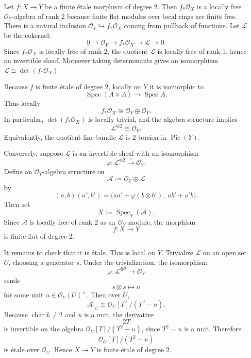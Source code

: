 \documentclass[12pt]{article}
\begin{document}
\begin{solution}
    Let \(f:X\to Y\) be a finite étale morphism of degree \(2\). Then \(f_*\mathcal O_X\) is a locally free \(\mathcal O_Y\)-algebra of rank \(2\) because finite flat modules over local rings are finite free. There is a natural inclusion $\mathcal O_Y\hookrightarrow f_*\mathcal O_X$
    coming from pullback of functions. Let \(\mathcal L\) be the cokernel:
    \[
        0\to \mathcal O_Y\to f_*\mathcal O_X\to \mathcal L\to 0.
    \]
    Since \(f_*\mathcal O_X\) is locally free of rank \(2\), the quotient \(\mathcal L\) is locally free of rank \(1\), hence an invertible sheaf. Moreover taking determinants gives an isomorphism $\mathcal L\cong \det(f_*\mathcal O_X)$

    Because \(f\) is finite étale of degree \(2\), locally on \(Y\) it is isomorphic to
    \[
        \operatorname{Spec}(A\times A)\to \operatorname{Spec} A.
    \]
    Thus locally
    \[
        f_*\mathcal O_X\cong \mathcal O_Y\oplus \mathcal O_Y.
    \]
    In particular, \(\det(f_*\mathcal O_X)\) is locally trivial, and the algebra structure implies
    \[
        \mathcal L^{\otimes 2}\cong \mathcal O_Y.
    \]
    Equivalently, the quotient line bundle \(\mathcal L\) is \(2\)-torsion in \(\operatorname{Pic}(Y)\).

    Conversely, suppose \(\mathcal L\) is an invertible sheaf with an isomorphism
    \[
        \varphi:\mathcal L^{\otimes 2}\xrightarrow{\sim}\mathcal O_Y.
    \]
    Define an \(\mathcal O_Y\)-algebra structure on
    \[
        \mathcal A:=\mathcal O_Y\oplus \mathcal L
    \]
    by
    \[
        (a,b)(a',b')
        =
        \bigl(aa'+\varphi(b\otimes b'),\; ab'+a'b\bigr).
    \]
    Then set
    \[
        X:=\operatorname{Spec}_Y(\mathcal A).
    \]
    Since \(\mathcal A\) is locally free of rank \(2\) as an \(\mathcal O_Y\)-module, the morphism
    \[
        f:X\to Y
    \]
    is finite flat of degree \(2\).

    It remains to check that it is étale. This is local on \(Y\). Trivialize \(\mathcal L\) on an open set \(U\), choosing a generator \(s\). Under the trivialization, the isomorphism
    \[
        \varphi:\mathcal L^{\otimes 2}\to \mathcal O_Y
    \]
    sends
    \[
        s\otimes s\mapsto u
    \]
    for some unit \(u\in \mathcal O_Y(U)^\times\). Then over \(U\),
    \[
        \mathcal A|_U\cong \mathcal O_U[T]/(T^2-u).
    \]
    Because \(\operatorname{char} k\neq 2\) and \(u\) is a unit, the derivative
    \[
        2T
    \]
    is invertible on the algebra \(\mathcal O_U[T]/(T^2-u)\), since \(T^2=u\) is a unit. Therefore
    \[
        \mathcal O_U[T]/(T^2-u)
    \]
    is étale over \(\mathcal O_U\). Hence \(X\to Y\) is finite étale of degree \(2\).


\end{solution}
\end{document}
